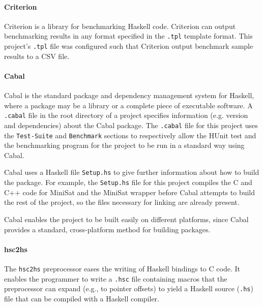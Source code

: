 \documentclass[12pt,a4paper,twoside,openright]{report}
\begin{document}
{\paragraph{Criterion}{
Criterion \cite{criterion} is a library for benchmarking Haskell code.
Criterion can output benchmarking results in any format specified in the \verb,.tpl,
template format. This project's \verb,.tpl, file
was configured such that Criterion output benchmark sample results to a
CSV file.}

\paragraph{Cabal}{
Cabal \cite{cabal} is the standard package and dependency management system for Haskell,
where a package may be a library or a complete piece of executable software.
A \verb,.cabal, file in the root directory of a project specifies
information (e.g. version and dependencies) about the Cabal package.
The \verb,.cabal, file for this project uses the \verb,Test-Suite, and \verb,Benchmark,
sections to respectively allow the HUnit test and the benchmarking
program for the project to be run in a standard way using Cabal.

Cabal uses a Haskell file \verb,Setup.hs, to give further information
about how to build the package. For example, the \verb,Setup.hs, file
for this project compiles the C and C++ code for MiniSat and the MiniSat
wrapper before Cabal attempts to build the rest of the project, so the
files necessary for linking are already present.

Cabal enables the project to be built easily on different platforms,
since Cabal provides a standard, cross-platform method for building packages.}

\paragraph{hsc2hs}{
The \verb,hsc2hs, preprocessor \cite{hsc2hs} eases the writing of Haskell bindings to C
code.
It enables the programmer to write a \verb,.hsc, file containing
macros that the preprocessor can expand (e.g., to pointer offsets)
to yield a Haskell source (\verb,.hs,) file that can be compiled with a
Haskell compiler.
}

}
\end{document}
